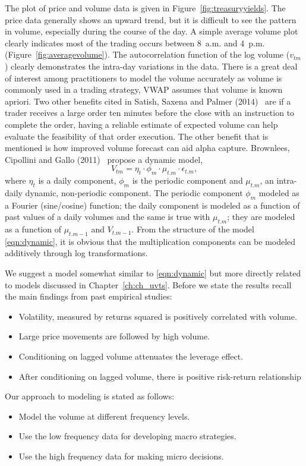 The plot of price and volume data is given in Figure~\ref{fig:treasuryyields}. The price data generally shows an upward trend, but it is difficult to see the pattern in volume, especially during the course of the day. A simple average volume plot clearly indicates most of the trading occurs between 8~a.m. and 4~p.m. (Figure~\ref{fig:averagevolume}). The autocorrelation function of the log volume ($v_{tm}$) clearly demonstrates the intra-day variations in the data. There is a great deal of interest among practitioners to model the volume accurately as volume is commonly used in a trading strategy, VWAP assumes that volume is known apriori. Two other benefits cited in Satish, Saxena and Palmer (2014)~\cite{satish} are if a trader receives a large order ten minutes before the close with an instruction to complete the order, having a reliable estimate of expected volume can help evaluate the feasibility of that order execution. The other benefit that is mentioned is how improved volume forecast can aid alpha capture. Brownlees, Cipollini and Gallo (2011)~\cite{brownless} propose a dynamic model,
	\begin{equation} \label{eqn:dynamic}
	V_{tm}= \eta_t \cdot \phi_m \cdot \mu_{t.m} \cdot \epsilon_{t.m},
	\end{equation}
where $\eta_t$ is a daily component, $\phi_m$ is the periodic component and $\mu_{t.m}$, an intra-daily dynamic, non-periodic component. The periodic component $\phi_m$ modeled as a Fourier (sine/cosine) function; the daily component is modeled as a function of past values of a daily volumes and the same is true with $\mu_{t.m}$; they are modeled as a function of $\mu_{t.m-1}$ and $V_{t.m-1}$. From the structure of the model \eqref{eqn:dynamic}, it is obvious that the multiplication components can be modeled additively through log transformations.


We suggest a model somewhat similar to \eqref{eqn:dynamic} but more directly related to models discussed in Chapter~\ref{ch:ch_uvts}. Before we state the results recall the main findings from past empirical studies:
	\begin{itemize}
	\item Volatility, measured by returns squared is positively correlated with volume.
	\item Large price movements are followed by high volume.
	\item Conditioning on lagged volume attenuates the leverage effect.
	\item After conditioning on lagged volume, there is positive risk-return relationship
	\end{itemize}
Our approach to modeling is stated as follows:
	\begin{itemize}
	\item Model the volume at different frequency levels.
	\item Use the low frequency data for developing macro strategies.
	\item Use the high frequency data for making micro decisions.
	\end{itemize}

